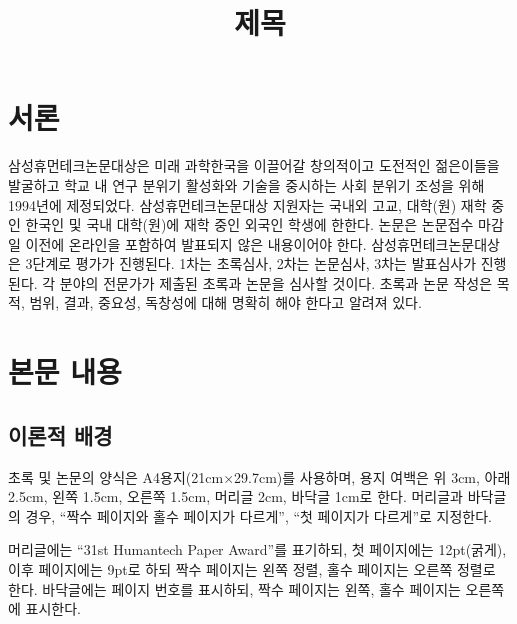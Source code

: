 \documentclass[kor]{humantech}
\title{제목} %
\begin{document}
	
	\section{서론}
	삼성휴먼테크논문대상은 미래 과학한국을 이끌어갈 창의적이고 도전적인 젊은이들을 발굴하고 학교 내 연구 분위기 활성화와 기술을 중시하는 사회 분위기 조성을 위해 1994년에 제정되었다. 삼성휴먼테크논문대상 지원자는 국내외 고교, 대학(원) 재학 중인 한국인 및 국내 대학(원)에 재학 중인 외국인 학생에 한한다. 논문은 논문접수 마감일 이전에 온라인을 포함하여 발표되지 않은 내용이어야 한다. 삼성휴먼테크논문대상은 3단계로 평가가 진행된다. 1차는 초록심사, 2차는 논문심사, 3차는 발표심사가 진행된다. 각 분야의 전문가가 제출된 초록과 논문을 심사할 것이다. 초록과 논문 작성은 목적, 범위, 결과, 중요성, 독창성에 대해 명확히 해야 한다고 알려져 있다.
	
	\section{본문 내용}
	\subsection{이론적 배경}
	초록 및 논문의 양식은 A4용지(21cm×29.7cm)를 사용하며, 용지 여백은 위 3cm, 아래 2.5cm, 왼쪽 1.5cm, 오른쪽 1.5cm, 머리글 2cm, 바닥글 1cm로 한다. 머리글과 바닥글의 경우, ``짝수 페이지와 홀수 페이지가 다르게'', ``첫 페이지가 다르게''로 지정한다.
	
	머리글에는 ``31st Humantech Paper Award''를 표기하되, 첫 페이지에는 12pt(굵게), 이후 페이지에는 9pt로 하되 짝수 페이지는 왼쪽 정렬, 홀수 페이지는 오른쪽 정렬로 한다. 바닥글에는 페이지 번호를 표시하되, 짝수 페이지는 왼쪽, 홀수 페이지는 오른쪽에 표시한다.
	
\end{document}
